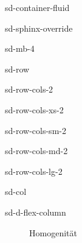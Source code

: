 \documentclass[letterpaper,10pt,english]{jupyterBook}
\let\sphinxpxdimen\pdfpxdimen\else\newdimen\sphinxpxdimen
\begin{document}
\begin{sphinxuseclass}{sd-container-fluid}
\begin{sphinxuseclass}{sd-sphinx-override}
\begin{sphinxuseclass}{sd-mb-4}
\begin{sphinxuseclass}{sd-row}
\begin{sphinxuseclass}{sd-row-cols-2}
\begin{sphinxuseclass}{sd-row-cols-xs-2}
\begin{sphinxuseclass}{sd-row-cols-sm-2}
\begin{sphinxuseclass}{sd-row-cols-md-2}
\begin{sphinxuseclass}{sd-row-cols-lg-2}
\begin{sphinxuseclass}{sd-col}
\begin{sphinxuseclass}{sd-d-flex-column}
\begin{figure}[htbp]
\noindent\sphinxincludegraphics[width=400\sphinxpxdimen]{{LTI_homo}.jpg}
\caption{Homogenität}\label{\detokenize{content/5_LTI:lti-homo}}\end{figure}

\end{sphinxuseclass}
\end{sphinxuseclass}
\end{sphinxuseclass}
\end{sphinxuseclass}
\end{sphinxuseclass}
\end{sphinxuseclass}
\end{sphinxuseclass}
\end{sphinxuseclass}
\end{sphinxuseclass}
\end{sphinxuseclass}
\end{sphinxuseclass}
\end{document}
